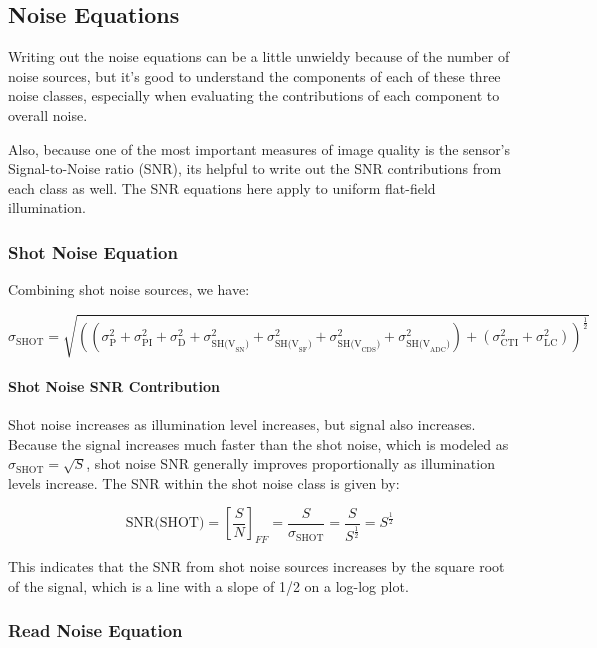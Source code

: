 \documentclass[10pt]{article}
\begin{document}
\subsection{Noise Equations}

Writing out the noise equations can be a little unwieldy because of the number of noise sources, but it's good to understand the components of each  of these three noise classes, especially when evaluating the contributions of each component to overall noise. 

Also, because one of the most important measures of image quality is the sensor's Signal-to-Noise ratio (SNR), its helpful to write out the SNR contributions from each class as well. The SNR equations here apply to uniform flat-field illumination.

\subsubsection{Shot Noise Equation}

Combining shot noise sources, we have:

$$ \sigma_{\text{SHOT}} = \sqrt{  \left ( (\sigma^2_{\text{P}} + \sigma^2_{\text{PI}} + \sigma^2_{\text{D}} + \sigma^2_{{\text{SH(V}_{{\text{SN}}})}} + \sigma^2_{{\text{SH(V}_{{\text{SF}}})}}+\sigma^2_{{\text{SH(V}_{{\text{CDS}}})}}+\sigma^2_{{\text{SH(V}_{{\text{ADC}}})}} )+  (\sigma^2_{\text{CTI}} + \sigma^2_{\text{LC}}) \right )^{\frac{1}{2}} }     $$

\paragraph{Shot Noise SNR Contribution}

Shot noise increases as illumination level increases, but signal also increases. Because the signal increases much faster than the shot noise, which is modeled as $\sigma_{\text{SHOT}} = \sqrt{S}$, shot noise SNR generally improves proportionally as illumination levels increase. The SNR within the shot noise class is given by:

$$ \text{SNR(SHOT)} = \left [ \frac{S}{N} \right ] _ {FF} = \frac{S}{\sigma_{\text{SHOT}}} = \frac{S}{S^{\frac{1}{2}}} = S^{\frac{1}{2}}$$

This indicates that the SNR from shot noise sources increases by the square root of the signal, which is a line with a slope of 1/2 on a log-log plot.

\subsubsection{Read Noise Equation}
\end{document}

